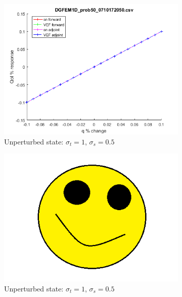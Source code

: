 \documentclass[12pt]{report}
\newcommand{\sigt}{\sigma_t}
\newcommand{\sigs}{\sigma_s}
\begin{document}
\begin{figure}[H]
\begin{subfigure}{.5\textwidth}
  \includegraphics[width=.98\linewidth]{figures/50qSens.png}
  \caption{Unperturbed state: $\sigt=1$, $\sigs=0.5$}
  \label{fig:sfig2}
\end{subfigure}%
\begin{subfigure}{.5\textwidth}
  \centering
  \includegraphics[width=.98\linewidth]{figures/holder.png}
  \caption{Unperturbed state: $\sigt=1$, $\sigs=0.5$}
  \label{fig:sfig5}
\end{subfigure}%
\\
\begin{subfigure}{.5\textwidth}
  \centering

\end{subfigure}
\end{figure}
\end{document}
